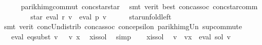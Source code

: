 \begin{isabellebody}
\ \ \ \ \isamarkupfalse%
\ parikh{\isacharunderscore}{\kern0pt}img{\isacharunderscore}{\kern0pt}commut\ conc{\isacharunderscore}{\kern0pt}star{\isacharunderscore}{\kern0pt}star\ \isamarkupfalse%
\ {\isacharparenleft}{\kern0pt}smt\ {\isacharparenleft}{\kern0pt}verit{\isacharcomma}{\kern0pt}\ best{\isacharparenright}{\kern0pt}\ conc{\isacharunderscore}{\kern0pt}assoc\ conc{\isacharunderscore}{\kern0pt}star{\isacharunderscore}{\kern0pt}comm{\isacharparenright}{\kern0pt}\isanewline
\ \ \isamarkupfalse%
\ \isamarkupfalse%
\ {\isachardoublequoteopen}{\isasymdots}\ {\isacharequal}{\kern0pt}\ {\isasymPsi}\ {\isacharparenleft}{\kern0pt}star\ {\isacharparenleft}{\kern0pt}eval\ {\isacharquery}{\kern0pt}r\ v{\isacharparenright}{\kern0pt}\ {\isacharat}{\kern0pt}{\isacharat}{\kern0pt}\ eval\ p\ v{\isacharparenright}{\kern0pt}{\isachardoublequoteclose}\isanewline
\ \ \ \ \isamarkupfalse%
\ star{\isacharunderscore}{\kern0pt}unfold{\isacharunderscore}{\kern0pt}left\isanewline
\ \ \ \ \isamarkupfalse%
\ {\isacharparenleft}{\kern0pt}smt\ {\isacharparenleft}{\kern0pt}verit{\isacharparenright}{\kern0pt}\ conc{\isacharunderscore}{\kern0pt}Un{\isacharunderscore}{\kern0pt}distrib{\isacharparenleft}{\kern0pt}{}{\isacharparenright}{\kern0pt}\ conc{\isacharunderscore}{\kern0pt}assoc\ conc{\isacharunderscore}{\kern0pt}epsilon{\isacharparenleft}{\kern0pt}{}{\isacharparenright}{\kern0pt}\ parikh{\isacharunderscore}{\kern0pt}img{\isacharunderscore}{\kern0pt}Un\ sup{\isacharunderscore}{\kern0pt}commute{\isacharparenright}{\kern0pt}\isanewline
\ \ \isamarkupfalse%
\ \isamarkupfalse%
\ {\isacharasterisk}{\kern0pt}{\isacharcolon}{\kern0pt}\ {\isachardoublequoteopen}{\isasymPsi}\ {\isacharparenleft}{\kern0pt}eval\ {\isacharquery}{\kern0pt}eq{\isacharunderscore}{\kern0pt}subst\ v{\isacharparenright}{\kern0pt}\ {\isasymsubseteq}\ {\isasymPsi}\ {\isacharparenleft}{\kern0pt}v\ x{\isacharparenright}{\kern0pt}{\isachardoublequoteclose}\ \isamarkupfalse%
\ x{\isacharunderscore}{\kern0pt}is{\isacharunderscore}{\kern0pt}sol\ \isamarkupfalse%
\ simp\isanewline
\ \ \isamarkupfalse%
\ x{\isacharunderscore}{\kern0pt}is{\isacharunderscore}{\kern0pt}sol\ \isamarkupfalse%
\ {\isachardoublequoteopen}v\ {\isacharequal}{\kern0pt}\ v{\isacharparenleft}{\kern0pt}x\ {\isacharcolon}{\kern0pt}{\isacharequal}{\kern0pt}\ eval\ sol\ v{\isacharparenright}{\kern0pt}{\isachardoublequoteclose}\ \isamarkupfalse%

\end{isabellebody}
